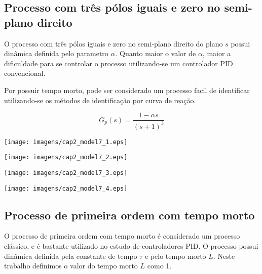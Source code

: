 \subsection{Processo com três pólos iguais e zero no semi-plano direito}

    O processo com três pólos iguais e zero no semi-plano direito do plano $s$
    possui dinâmica definida pelo parametro $\alpha$. Quanto maior o valor de
    $\alpha$, maior a dificuldade para se controlar o processo utilizando-se
    um controlador \acs{PID} convencional.
    
    Por possuir tempo morto, pode ser considerado um processo facil de identificar
    utilizando-se os métodos de identificação por curva de reação.

    \begin{equation}
        G_p(s) = \frac{1-\alpha s}{(s+1)^3}
    \end{equation}

    \begin{center}
        \texttt{[image: imagens/cap2\_model7\_1.eps]}
    \end{center}

    \begin{center}
        \texttt{[image: imagens/cap2\_model7\_2.eps]}
    \end{center}
    
    \begin{center}
        \texttt{[image: imagens/cap2\_model7\_3.eps]}
    \end{center}
    
    \begin{center}
        \texttt{[image: imagens/cap2\_model7\_4.eps]}
    \end{center}

\subsection{Processo de primeira ordem com tempo morto}

    O processo de primeira ordem com tempo morto é considerado um processo
    clássico, e é bastante utilizado no estudo de controladores \acs{PID}. O
    processo possui dinâmica definida pela constante de tempo $\tau$ e pelo
    tempo morto $L$. Neste trabalho definimos o valor do tempo morto $L$ como 1.
    
